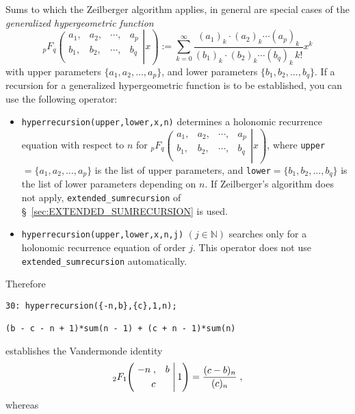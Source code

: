 Sums to which the Zeilberger algorithm applies, in general are
special cases of the {\sl generalized hypergeometric function}
\[
_{p}F_{q}\left.\left(\begin{array}{cccc}
a_{1},&a_{2},&\cdots,&a_{p}\\
b_{1},&b_{2},&\cdots,&b_{q}\\
            \end{array}\right| x\right)
:=
\sum_{k=0}^\infty \frac
{(a_{1})_{k}\cdot(a_{2})_{k}\cdots(a_{p})_{k}}
{(b_{1})_{k}\cdot(b_{2})_{k}\cdots(b_{q})_{k}\,k!}x^{k}
\label{eq:coefficientformula}
\]
with upper parameters $\{a_{1}, a_{2}, \ldots, a_{p}\}$, and lower
parameters $\{b_{1}, b_{2}, \ldots, b_{q}\}$. If a recursion for a
generalized hypergeometric function is to be established, you can use
the following \REDUCE{} operator:
\begin{itemize}
\item
{\tt hyperrecursion(upper,lower,x,n)} determines a holonomic recurrence 
equation with respect to $n$ for 
$_{p}F_{q}\left.\left(\begin{array}{cccc}
a_{1},&a_{2},&\cdots,&a_{p}\\
b_{1},&b_{2},&\cdots,&b_{q}\\
            \end{array}\right| x\right)
$, where {\tt upper}$=\{a_{1}, a_{2}, \ldots, a_{p}\}$
is the list of upper parameters, and 
{\tt lower}$=\{b_{1}, b_{2}, \ldots, b_{q}\}$
is the list of lower parameters depending on $n$. If Zeilberger's algorithm
does not apply, {\tt extended\verb+_+sumrecursion} 
of \S~\ref{sec:EXTENDED_SUMRECURSION} is used.
\item
{\tt hyperrecursion(upper,lower,x,n,j)} $(j\in\mathbb{N})$
searches only for a holonomic recurrence equation of order $j$. This
operator does not use {\tt extended\verb+_+sumrecursion} automatically.
\end{itemize}
Therefore

{\small
\begin{verbatim}
30: hyperrecursion({-n,b},{c},1,n);

(b - c - n + 1)*sum(n - 1) + (c + n - 1)*sum(n)
\end{verbatim}
}\noindent
establishes the Vandermonde identity
\[
_2 F_1\left.
\!\!
\left(
\!\!\!\!
\begin{array}{c}
\multicolumn{1}{c}{\begin{array}{cc} -n\;, & b \end{array}}\\[1mm]
\multicolumn{1}{c}{ c}
            \end{array}
\!\!\!\!
\right| 1\right)
=\frac{(c-b)_n}{(c)_n}
\;,
\]
whereas

